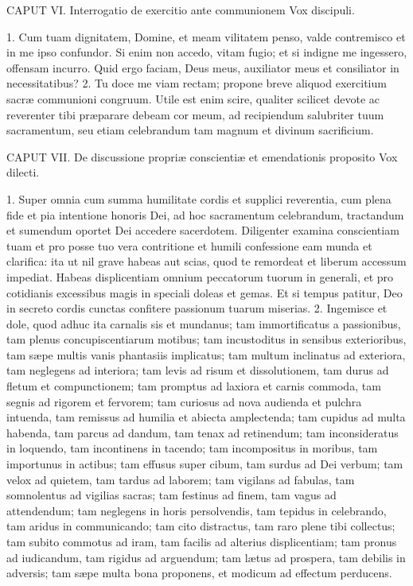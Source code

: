 CAPUT VI.
Interrogatio de exercitio ante communionem
Vox discipuli.

1. Cum tuam dignitatem, Domine, et meam vilitatem penso, valde contremisco et in me ipso confundor. Si enim non accedo, vitam fugio; et si indigne me ingessero, offensam incurro. Quid ergo faciam, Deus meus, auxiliator meus et consiliator in necessitatibus?
2. Tu doce me viam rectam; propone breve aliquod exercitium sacræ communioni congruum. Utile est enim scire, qualiter scilicet devote ac reverenter tibi præparare debeam cor meum, ad recipiendum salubriter tuum sacramentum, seu etiam celebrandum tam magnum et divinum sacrificium.


CAPUT VII.
De discussione propriæ conscientiæ et emendationis proposito
Vox dilecti.

1. Super omnia cum summa humilitate cordis et supplici reverentia, cum plena fide et pia intentione honoris Dei, ad hoc sacramentum celebrandum, tractandum et sumendum oportet Dei accedere sacerdotem. Diligenter examina conscientiam tuam et pro posse tuo vera contritione et humili confessione eam munda et clarifica: ita ut nil grave habeas aut scias, quod te remordeat et liberum accessum impediat. Habeas displicentiam omnium peccatorum tuorum in generali, et pro cotidianis excessibus magis in speciali doleas et gemas. Et si tempus patitur, Deo in secreto cordis cunctas confitere passionum tuarum miserias.
2. Ingemisce et dole, quod adhuc ita carnalis sis et mundanus; tam immortificatus a passionibus, tam plenus concupiscentiarum motibus; tam incustoditus in sensibus exterioribus, tam sæpe multis vanis phantasiis implicatus; tam multum inclinatus ad exteriora, tam neglegens ad interiora; tam levis ad risum et dissolutionem, tam durus ad fletum et compunctionem; tam promptus ad laxiora et carnis commoda, tam segnis ad rigorem et fervorem; tam curiosus ad nova audienda et pulchra intuenda, tam remissus ad humilia et abiecta amplectenda; tam cupidus ad multa habenda, tam parcus ad dandum, tam tenax ad retinendum; tam inconsideratus in loquendo, tam incontinens in tacendo; tam incompositus in moribus, tam importunus in actibus; tam effusus super cibum, tam surdus ad Dei verbum; tam velox ad quietem, tam tardus ad laborem; tam vigilans ad fabulas, tam somnolentus ad vigilias sacras; tam festinus ad finem, tam vagus ad attendendum; tam neglegens in horis persolvendis, tam tepidus in celebrando, tam aridus in communicando; tam cito distractus, tam raro plene tibi collectus; tam subito commotus ad iram, tam facilis ad alterius displicentiam; tam pronus ad iudicandum, tam rigidus ad arguendum; tam lætus ad prospera, tam debilis in adversis; tam sæpe multa bona proponens, et modicum ad effectum perducens.
